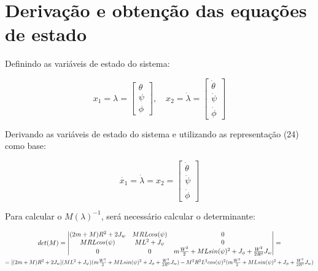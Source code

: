 \documentclass[10pt]{article}
\begin{document}
\section{Derivação e obtenção das equações de estado}

\quad Definindo as variáveis de estado do sistema:

\begin{equation}
    x_1 = \lambda =
    \begin{bmatrix}
        \theta \\
        \psi \\
        \phi
    \end{bmatrix}, \quad
    x_2 = \dot\lambda = 
    \begin{bmatrix}
        \dot\theta \\
        \dot\psi \\
        \dot\phi
    \end{bmatrix}
\end{equation}

\quad Derivando as variáveis de estado do sistema e utilizando as representação (24) como base:

\begin{equation}
    \dot{x_1} = \dot\lambda = x_2 =
    \begin{bmatrix}
        \dot\theta \\
        \dot\psi \\
        \dot\phi
    \end{bmatrix}
\end{equation}

\quad Para calcular o $M(\lambda)^{-1}$, será necessário calcular o determinante:

\begin{equation}
\begin{gathered}
    det(M) = 
    \begin{vmatrix}
        (2m + M)R^2 + 2J_w & MRLcos(\psi) & 0 \\
        MRLcos(\psi) & ML^2 + J_\psi & 0 \\
        0 & 0 & m\frac{W^2}{2} + MLsin(\psi)^2 + J_\phi + \frac{W^2}{2R^2}J_w \\
    \end{vmatrix} = \\
    \scalebox{0.85}{$
    = [(2m + M)R^2 + 2J_w](ML^2 + J_\psi)(m\frac{W^2}{2} + MLsin(\psi)^2 + J_\phi + \frac{W^2}{2R^2}J_w) -  M^2R^2L^2cos(\psi)^2(m\frac{W^2}{2} + MLsin(\psi)^2 + J_\phi + \frac{W^2}{2R^2}J_w)
    $}
\end{gathered}
\end{equation}
\end{document}

